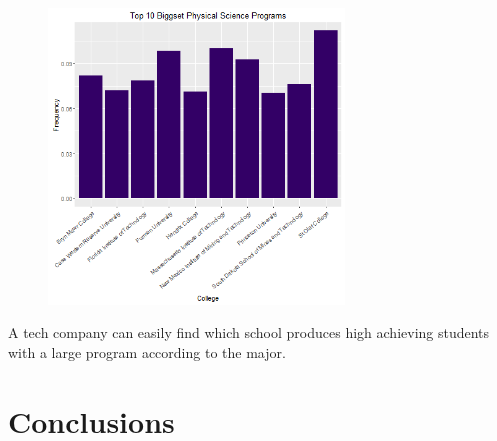 \documentclass{article}
\begin{document}
\begin{figure}[H]
\includegraphics[width=0.7\textwidth]{../images/biggestPhysical.png}
\end{figure}


A tech company can easily find which school produces high achieving students with a large program according to the major. 

\clearpage

\section{Conclusions}
\end{document}
